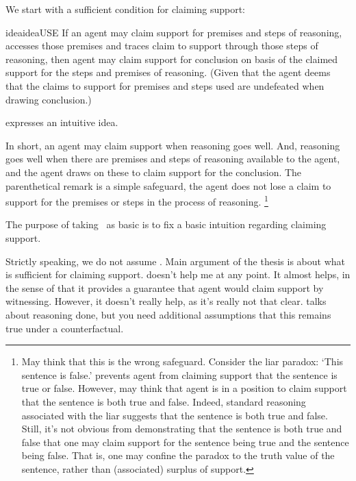 \begin{note}
  We start with a sufficient condition for claiming support:
  \begin{restatable}[\USE{-} --- \USE{}]{idea}{ideaUSE}\label{prem:bP}\label{prop:USE}
    If an agent may claim support for premises and steps of reasoning, accesses those premises and traces claim to support through those steps of reasoning, then agent may claim support for conclusion on basis of the claimed support for the steps and premises of reasoning.
    (Given that the agent deems that the claims to support for premises and steps used are undefeated when drawing conclusion.)
  \end{restatable}

  \USE{} expresses an intuitive idea.

    In short, an agent may claim support when reasoning goes well.
  And, reasoning goes well when there are premises and steps of reasoning available to the agent, and the agent draws on these to claim support for the conclusion.
  The parenthetical remark is a simple safeguard, the agent does not lose a claim to support for the premises or steps in the process of reasoning.\nolinebreak
  \footnote{
    May think that this is the wrong safeguard.
    Consider the liar paradox:
    `This sentence is false.'
    \USE{} prevents agent from claiming support that the sentence is true or false.
    However, may think that agent is in a position to claim support that the sentence is both true and false.
    Indeed, standard reasoning associated with the liar suggests that the sentence is both true and false.
    Still, it's not obvious from demonstrating that the sentence is both true and false that one may claim support for the sentence being true and the sentence being false.
    That is, one may confine the paradox to the truth value of the sentence, rather than (associated) surplus of support.
  }

  The purpose of taking~\USE{} as basic is to fix a basic intuition regarding claiming support.

  Strictly speaking, we do not assume \USE{}.
  Main argument of the thesis is about what is sufficient for claiming support.
  {
    \color{red}
    \USE{} doesn't help me at any point.
    It almost helps, in the sense of that it provides a guarantee that agent would claim support by witnessing.
    However, it doesn't really help, as it's really not that clear.
    \USE{} talks about reasoning done, but you need additional assumptions that this remains true under a counterfactual.
  }
\end{note}

